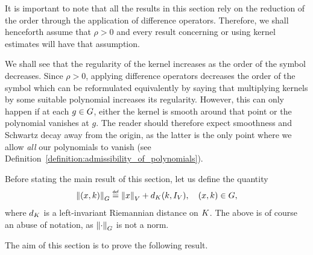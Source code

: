 It is important to note that all the results in this section rely on the reduction of the order
through the application of difference operators.
Therefore,
we shall henceforth assume that $\rho > 0$
and every result concerning or using kernel estimates will have that assumption.

We shall see that the regularity of the kernel increases
as the order of the symbol decreases.
Since $\rho > 0$, applying difference operators decreases the order of the symbol
which can be reformulated equivalently
by saying that multiplying kernels by some suitable polynomial increases its regularity.
However, this can only happen if at each $g \in \Group$,
either the kernel is smooth around that point or the polynomial vanishes at $g$.
The reader should therefore expect smoothness and Schwartz decay away from the origin,
as the latter is the only point where we allow \emph{all} our polynomials to vanish
(see Definition~\ref{definition:admissibility_of_polynomials}).

Before stating the main result of this section,
let us define the quantity
\begin{align*}
    \norm [\Group] {(x, k)} \defeq \norm {x} + d_\CompactGroup(k, \Id{\VectorSpace}), \quad (x, k) \in \Group,
\end{align*}
where $d_\CompactGroup$ is a left-invariant Riemannian distance on $\CompactGroup$.
The above is of course an abuse of notation, as $\norm [\Group] \dummy$ is not a norm.

The aim of this section is to prove the following result.

